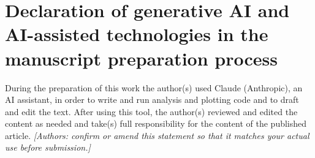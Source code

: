 \documentclass[a4paper,preprint,12pt,authoryear]{elsarticle}
\begin{document}
\section*{Declaration of generative AI and AI-assisted technologies in the manuscript preparation process}
During the preparation of this work the author(s) used Claude (Anthropic), an AI assistant, in order to write and run analysis and plotting code and to draft and edit the text. After using this tool, the author(s) reviewed and edited the content as needed and take(s) full responsibility for the content of the published article. \emph{[Authors: confirm or amend this statement so that it matches your actual use before submission.]}

\end{document}
